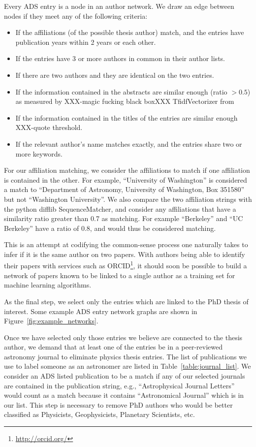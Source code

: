 \documentclass[preprint2]{aastex}
\begin{document}
Every ADS entry is a node in an author network. We draw an edge between nodes if they meet any of the following criteria:

\begin{itemize}
\item{If the affiliations (of the possible thesis author) match, and the entries have publication years within 2 years or each other.}
\item{If the entries have 3 or more authors in common in their author lists.}
\item{If there are two authors and they are identical on the two entries.}
\item{If the information contained in the abstracts are similar enough (ratio $> 0.5$) as measured by XXX-magic fucking black boxXXX TfidfVectorizer from \citet{scikit-learn}}
\item{If the information contained in the titles of the entries are similar enough XXX-quote threshold.}
\item{If the relevant author's name matches exactly, and the entries share two or more keywords.}
\end{itemize}

For our affiliation matching, we consider the affiliations to match if one affiliation is contained in the other.  For example, ``University of Washington'' is considered a match to ``Department of Astronomy, University of Washington, Box 351580'' but not ``Washington University''.  We also compare the two affiliation strings with the python difflib SequenceMatcher, and consider any affiliations that have a similarity ratio greater than 0.7 as matching.  For example ``Berkeley'' and ``UC Berkeley'' have a ratio of 0.8, and would thus be considered matching.

This is an attempt at codifying the common-sense process one naturally takes to infer if it is the same author on two papers. With authors being able to identify their papers with services such as ORCID\footnote{\url{http://orcid.org/}}, it should soon be possible to build a network of papers known to be linked to a single author as a training set for machine learning algorithms.  

As the final step, we select only the entries which are linked to the PhD thesis of interest.  Some example ADS entry network graphs are shown in Figure~\ref{fig:example_networks}.

Once we have selected only those entries we believe are connected to the thesis author, we demand that at least one of the entries be in a peer-reviewed astronomy journal to eliminate physics thesis entries.  The list of publications we use to label someone as an astronomer are listed in Table~\ref{table:journal_list}. We consider an ADS listed publication to be a match if any of our selected journals are contained in the publication string, e.g., ``Astrophysical Journal Letters'' would count as a match because it contains ``Astronomical Journal'' which is in our list.  This step is necessary to remove PhD authors who would be better classified as Physicists, Geophysicists, Planetary Scientists, etc. 
\end{document}
